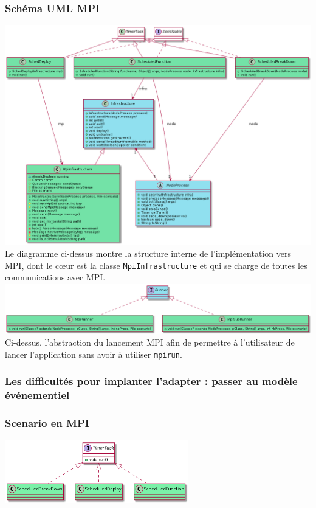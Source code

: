 \documentclass{article}
\begin{document}
				\subsubsection{Schéma UML MPI}
				\vspace{1mm}
				\hspace*{-2.1cm} \includegraphics[width=19.5cm]{uml/mpi1.png}
				Le diagramme ci-dessus montre la structure interne de l'implémentation vers MPI, dont le cœur est la classe \verb|MpiInfrastructure|
				et qui se charge de toutes les communications avec MPI.
				\hspace*{-2.3cm} \includegraphics[width=20cm]{uml/mpi2.png}
				Ci-dessus, l'abstraction du lancement MPI afin de permettre à l'utilisateur de lancer l'application sans avoir à utiliser \verb|mpirun|.
				\subsubsection{Les difficultés pour implanter l'adapter : passer au modèle événementiel}
				\subsubsection{Scenario en MPI}
				\vspace{5mm}
				\hspace*{4cm} \includegraphics[width=80mm]{uml/scenMPIuml.png}
				
\end{document}
